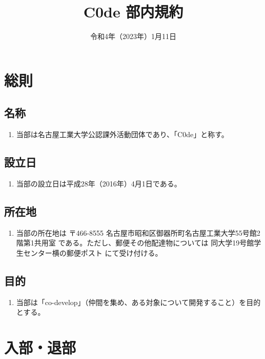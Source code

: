\documentclass[12pt, unicode, a4paper]{ltjsreport}
\title{C0de 部内規約}
\date{令和4年（2023年）1月11日}
\begin{document}
\maketitle

\tableofcontents

\chapter{総則}
    \section{名称}
        \begin{enumerate}
            \item 当部は名古屋工業大学公認課外活動団体であり、「C0de」と称す。
        \end{enumerate}

    \section{設立日}
        \begin{enumerate}
            \item 当部の設立日は平成28年（2016年）4月1日である。
        \end{enumerate}

    \section{所在地}
        \begin{enumerate}
            \item 当部の所在地は 〒466-8555 名古屋市昭和区御器所町名古屋工業大学55号館2階第1共用室 である。ただし、郵便その他配達物については 同大学19号館学生センター横の郵便ポスト にて受け付ける。
        \end{enumerate}

    \section{目的}\label{purpose}
        \begin{enumerate}
            \item 当部は「co-develop」（仲間を集め、ある対象について開発すること）を目的とする。
        \end{enumerate}


\chapter{入部・退部}
\end{document}
